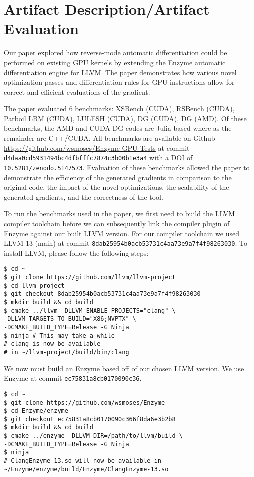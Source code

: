 \appendix
\section{Artifact Description/Artifact Evaluation}

%

Our paper explored how reverse-mode automatic differentiation could be performed on existing GPU kernels by extending the Enzyme automatic differentiation engine for LLVM. The paper demonstrates how various novel optimization passes and differentiation rules for GPU instructions allow for correct and efficient evaluations of the gradient.

The paper evaluated 6 benchmarks: XSBench (CUDA), RSBench (CUDA), Parboil LBM (CUDA), LULESH (CUDA), DG (CUDA), DG (AMD). Of these benchmarks, the AMD and CUDA DG codes are Julia-based where as the remainder are C++/CUDA. All benchmarks are available on Github \url{https://github.com/wsmoses/Enzyme-GPU-Tests} at commit \verb|d4daa0cd5931494bc4dfbfffc7874c3b00b1e3a4| with a DOI of \verb|10.5281/zenodo.5147573|. Evaluation of these benchmarks allowed the paper to demonstrate the efficiency of the generated gradients in comparison to the original code, the impact of the novel optimizations, the scalability of the generated gradients, and the correctness of the tool.

To run the benchmarks used in the paper, we first need to build the LLVM compiler toolchain before we can subsequently link the compiler plugin of Enzyme against our built LLVM version. For our compiler toolchain we used LLVM 13 (main) at commit \verb|8dab25954b0acb53731c4aa73e9a7f4f98263030|. To install LLVM, please follow the following steps:

\begin{verbatim}
$ cd ~
$ git clone https://github.com/llvm/llvm-project
$ cd llvm-project
$ git checkout 8dab25954b0acb53731c4aa73e9a7f4f98263030
$ mkdir build && cd build
$ cmake ../llvm -DLLVM_ENABLE_PROJECTS="clang" \
-DLLVM_TARGETS_TO_BUILD="X86;NVPTX" \
-DCMAKE_BUILD_TYPE=Release -G Ninja
$ ninja # This may take a while
# clang is now be available
# in ~/llvm-project/build/bin/clang
\end{verbatim}

We now must build an Enzyme based off of our chosen LLVM version. We use Enzyme at commit \verb|ec75831a8cb0170090c36|.

\begin{verbatim}
$ cd ~
$ git clone https://github.com/wsmoses/Enzyme
$ cd Enzyme/enzyme
$ git checkout ec75831a8cb0170090c366f8da6e3b2b8
$ mkdir build && cd build
$ cmake ../enzyme -DLLVM_DIR=/path/to/llvm/build \
-DCMAKE_BUILD_TYPE=Release -G Ninja
$ ninja
# ClangEnzyme-13.so will now be available in 
~/Enzyme/enzyme/build/Enzyme/ClangEnzyme-13.so
\end{verbatim}


